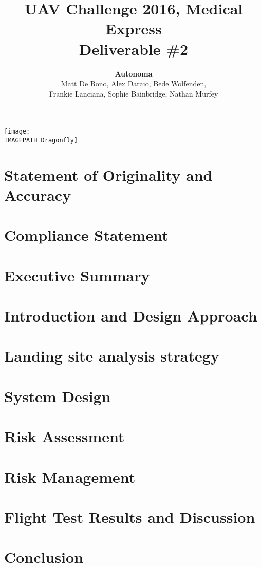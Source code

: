 \documentclass{article}
\title{UAV Challenge 2016, Medical Express\\ Deliverable \#2\\}
\author{
	\textbf{Autonoma}\\
	Matt De Bono,
	Alex Daraio,
	Bede Wolfenden,\\
	Frankie Lanciana,
	Sophie Bainbridge,
	Nathan Murfey}
\newcommand{\IMAGEPATH}{../Images/}
\begin{document}
\maketitle

\vspace{100pt}
\begin{center}
	\texttt{[image: \\IMAGEPATH Dragonfly]}
\end{center}


\clearpage

\tableofcontents

\clearpage

\section{Statement of Originality and Accuracy}


\clearpage

\section{Compliance Statement}
\begin{figure}
	
\end{figure}


\clearpage
\section{Executive Summary}


\clearpage
\section{Introduction and Design Approach}


\clearpage
\section{Landing site analysis strategy}


\clearpage
\section{System Design}


\clearpage
\section{Risk Assessment}


\clearpage
\section{Risk Management}


\clearpage
\section{Flight Test Results and Discussion}


\clearpage
\section{Conclusion}

\end{document}
